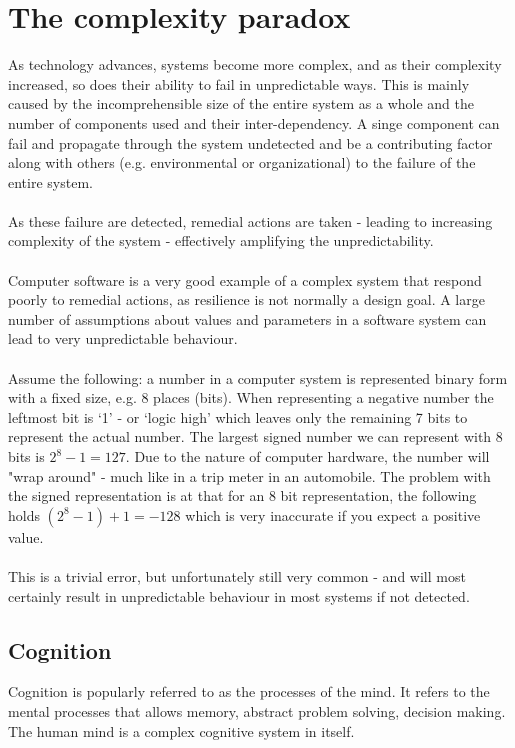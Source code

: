 \documentclass[10pt,oneside]{book}                  %
\begin{document}
\section{The complexity paradox}
\label{sec:complexity_problem}

As technology advances, systems become more complex, and as their complexity increased, so does their ability to fail in unpredictable ways. This is mainly caused by the incomprehensible size of the entire system as a whole and the number of components used and their inter-dependency.
A singe component can fail and propagate through the system undetected and be a contributing factor along with others (e.g. environmental or organizational) to the failure of the entire system.\\
\\
As these failure are detected, remedial actions are taken - leading to increasing complexity of the system - effectively amplifying the unpredictability.\\
\\
Computer software is a very good example of a complex system that respond poorly to remedial actions, as resilience is not normally a design goal. A large number of assumptions about values and parameters in a software system can lead to very unpredictable behaviour.\\
\\
Assume the following: a number in a computer system is represented binary form with a fixed size, e.g. 8 places (bits). When representing a negative number the leftmost bit is `1' - or `logic high' which leaves only the remaining 7 bits to represent the actual number. The largest signed number we can represent with 8 bits is $2^8 - 1 = 127$. Due to the nature of computer hardware, the number will "wrap around" - much like in a trip meter in an automobile. The problem with the signed representation is at that for an 8 bit representation, the following holds $(2^8-1)+1 = -128$ which is very inaccurate if you expect a positive value.\\
\\
This is a trivial error, but unfortunately still very common - and will most certainly result in unpredictable behaviour in most systems if not detected.

\subsection{Cognition}
Cognition is popularly referred to as the processes of the mind. It refers to the mental processes that allows memory, abstract problem solving, decision making. The human mind is a complex cognitive system in itself.
\end{document}
